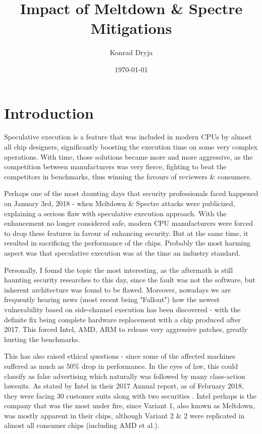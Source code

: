 \documentclass{csfourzero}
\title{Impact of Meltdown \& Spectre Mitigations}
\author{Konrad Dryja}
\date{\today}
\begin{document}
\maketitle


\section{Introduction}
\label{sec:intro}
Speculative execution is a feature that was included in modern CPUs by almost all chip designers, significantly boosting the execution time on some very complex operations. With time, those solutions became more and more aggressive, as the competition between manufacturers was very fierce, fighting to beat the competitors in benchmarks, thus winning the favours of reviewers \& consumers.

Perhaps one of the most daunting days that security professionals faced happened on January 3rd, 2018 - when Meltdown \& Spectre attacks were publicized, explaining a serious flaw with speculative execution approach. With the enhancement no longer considered safe, modern CPU manufacturers were forced to drop these features in favour of enhancing security. But at the same time, it resulted in sacrificing the performance of the chips. Probably the most harming aspect was that speculative execution was at the time an industry standard. 

Personally, I found the topic the most interesting, as the aftermath is still haunting security researches to this day, since the fault was not the software, but inherent architecture was found to be flawed. Moreover, nowadays we are frequently hearing news (most recent being "Fallout"\cite{fallout}) how the newest vulnerability based on side-channel execution has been discovered - with the definite fix being complete hardware replacement with a chip produced after 2017. This forced Intel, AMD, ARM to release very aggressive patches, greatly hurting the benchmarks.

This has also raised ethical questions - since some of the affected machines suffered as much as 50\% drop in performance. In the eyes of law, this could classify as false advertising which naturally was followed by many class-action lawsuits. As stated by Intel in their 2017 Annual report, as of February 2018, they were facing 30 customer suits along with two securities \cite{intelreport}. Intel perhaps is the company that was the most under fire, since Variant 1, also known as Meltdown, was mostly apparent in their chips, although Variant 2 \& 2 were replicated in almost all consumer chips (including AMD et al.).
\end{document}
